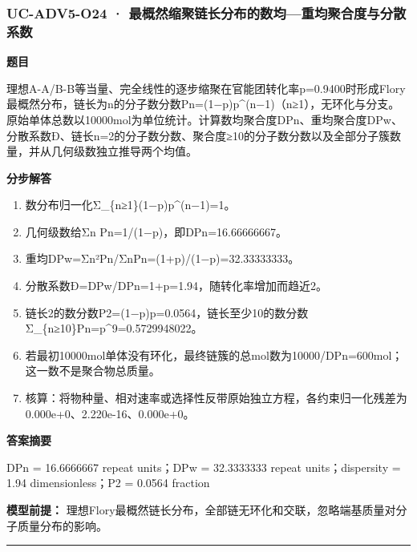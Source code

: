 \documentclass[UTF8,11pt,a4paper]{ctexart}
\begin{document}
\subsubsection*{UC-ADV5-O24 · 最概然缩聚链长分布的数均—重均聚合度与分散系数}
\noindent\textbf{题目}\par
理想A-A/B-B等当量、完全线性的逐步缩聚在官能团转化率p=0.9400时形成Flory最概然分布，链长为n的分子数分数Pn=(1−p)p\textasciicircum{}(n−1)（n≥1），无环化与分支。原始单体总数以10000mol为单位统计。计算数均聚合度DPn、重均聚合度DPw、分散系数Đ、链长n=2的分子数分数、聚合度≥10的分子数分数以及全部分子簇数量，并从几何级数独立推导两个均值。\par
\medskip\noindent\textbf{分步解答}
\begin{enumerate}
\item 数分布归一化Σ\_\{n≥1\}(1−p)p\textasciicircum{}(n−1)=1。
\item 几何级数给Σn Pn=1/(1−p)，即DPn=16.66666667。
\item 重均DPw=Σn²Pn/ΣnPn=(1+p)/(1−p)=32.33333333。
\item 分散系数Đ=DPw/DPn=1+p=1.94，随转化率增加而趋近2。
\item 链长2的数分数P2=(1−p)p=0.0564，链长至少10的数分数Σ\_\{n≥10\}Pn=p\textasciicircum{}9=0.5729948022。
\item 若最初10000mol单体没有环化，最终链簇的总mol数为10000/DPn=600mol；这一数不是聚合物总质量。
\item 核算：将物种量、相对速率或选择性反带原始独立方程，各约束归一化残差为 0.000e+0、2.220e-16、0.000e+0。
\end{enumerate}
\noindent\textbf{答案摘要}\par
DPn = 16.6666667 repeat units；DPw = 32.3333333 repeat units；dispersity = 1.94 dimensionless；P2 = 0.0564 fraction\par
\noindent\textbf{模型前提：}
理想Flory最概然链长分布，全部链无环化和交联，忽略端基质量对分子质量分布的影响。\par
\medskip\hrule\medskip
{}
\end{document}
